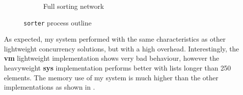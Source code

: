 \documentclass[12pt,twoside,notitlepage]{report}
\theoremstyle{plain}%
\theoremstyle{definition}
\theoremstyle{remark}
\begin{document}
\begin{figure}
\begin{subfigure}[b]{0.45\linewidth}
\caption{Full sorting network}
\label{fig:sorter_process_full}
\end{subfigure}
\cprotect\caption{\verb|sorter| process outline}
\label{fig:sorter_process_outline}
\end{figure}

As expected, my system performed with the same characteristics as other lightweight concurrency solutions, but with a high overhead. Interestingly, the \textbf{vm} lightweight implementation shows very bad behaviour, however the heavyweight \textbf{sys} implementation performs better with lists longer than 250 elements. The memory use of my system is much higher than the other implementations as shown in .
\end{document}

